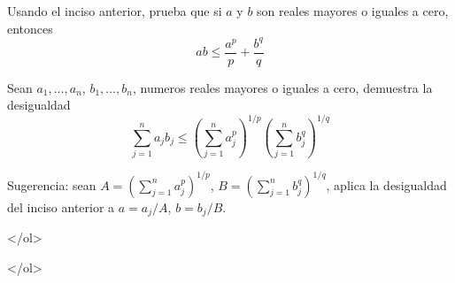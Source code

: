 \documentclass{article}
\theoremstyle{definition}
\begin{document}
          \item Usando el inciso anterior, prueba que si $a$ y $b$ son
            reales mayores o iguales a cero, entonces
            $$
            ab \leq \frac{a^p}{p}+\frac{b^q}{q}
            $$
          \item Sean $a_1,\dots, a_n$, $b_1,\dots, b_n$, numeros
            reales mayores o iguales a cero, demuestra la desigualdad
            $$
            \sum_{j=1}^n a_jb_j \leq \left( \sum_{j=1}^n a_j^p \right)^{1/p}
            \left( \sum_{j=1}^n b_j^q \right)^{1/q}
            $$

            Sugerencia: sean $A=\left( \sum_{j=1}^n a_j^p \right)^{1/p}$,
            $B=\left( \sum_{j=1}^n b_j^q \right)^{1/q}$, aplica
            la desigualdad del inciso anterior a $a=a_j/A$, $b=b_j/B$.
         
          </ol>
          
            
          </ol>
          

          

	
  
       
\end{document}

